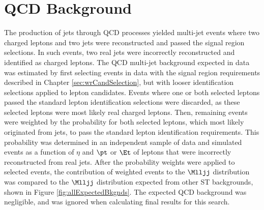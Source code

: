 \section{QCD Background}
\label{sec:qcdBkgnd}
The production of jets through QCD processes yielded multi-jet events where two charged leptons and two jets were reconstructed 
and passed the signal region selections.  In such events, two real jets were incorrectly reconstructed and identified as charged 
leptons.  The QCD multi-jet background expected in data was estimated by first selecting events in data with the signal region requirements 
described in Chapter \ref{sec:wrCandSelection}, but with looser identification selections applied to lepton candidates.  Events where one 
or both selected leptons passed the standard lepton identification selections were discarded, as these selected leptons were most likely 
real charged leptons.  Then, remaining events were weighted by the probability for both selected leptons, which most likely 
originated from jets, to pass the standard lepton identification requirements.  This probability was determined in an independent 
sample of data and simulated events as a function of $\eta$ and $\pt$ or $\Et$ of leptons that were incorrectly reconstructed from 
real jets.  After the probability weights were applied to selected events, the contribution of weighted events to the $\Mlljj$ 
distribution was compared to the $\Mlljj$ distribution expected from other ST backgrounds, shown in Figure \ref{fig:allExpectedBkgnds}.  
The expected QCD background was negligible, and was ignored when calculating final results for this search.


